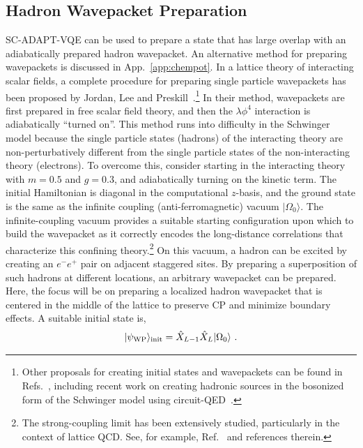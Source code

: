 \documentclass[aps, prc, tightenlines,superscriptaddress, letterpaper, amsmath, amssymb, preprintnumbers, floatfix, longbibliography, nofootinbib]{revtex4-2}
\begin{document}
\subsection{Hadron Wavepacket Preparation}
\label{sec:SCADAPTWP}
\noindent
SC-ADAPT-VQE can be used to prepare a state that has large overlap with an adiabatically prepared hadron wavepacket.
An alternative method for preparing wavepackets is discussed in App.~\ref{app:chempot}.
In a lattice theory of interacting scalar fields, a complete procedure for preparing single particle wavepackets has been proposed by Jordan, Lee and Preskill~\cite{Jordan_2018,DBLP:journals/qic/JordanLP14}.\footnote{Other proposals for creating initial states and wavepackets can be found in Refs.~\cite{Kuhn:2015zqa,Pichler:2015yqa,Damme:2019rts,Avkhadiev:2019niu,Surace:2020ycc,Karpov:2020pqe,Milsted:2020jmf,Vovrosh:2022bpj,Asaduzzaman:2022bpi,Avkhadiev:2022ttx,Farrell:2022vyh,Atas:2022dqm,Vary:2023ihk,Chai:2023qpq,Roy:2023uil}, including recent work on creating hadronic sources in the bosonized form of the Schwinger model using circuit-QED~\cite{Belyansky:2023rgh}.}
In their method, wavepackets are first prepared in free scalar field theory, and then the $\lambda \phi^4$ interaction is adiabatically ``turned on''.
This method runs into difficulty in the Schwinger model because the single particle states (hadrons) of the interacting theory are non-perturbatively different from the single particle states of the non-interacting theory (electrons).
To overcome this, consider starting in the interacting theory with $m=0.5$ and $g=0.3$, and adiabatically turning on the kinetic term.
The initial Hamiltonian is diagonal in the computational $z$-basis, and the ground state is the same as the infinite coupling (anti-ferromagnetic) vacuum $\vert \Omega_0 \rangle$.
The infinite-coupling vacuum provides a suitable starting configuration upon which to build the wavepacket as it correctly encodes the long-distance correlations that characterize this confining theory.\footnote{The strong-coupling limit has been extensively studied, particularly in the context of lattice QCD. See, for example, Ref.~\cite{Fromm:2009xw} and references therein.}
On this vacuum, a hadron can be excited by creating an $e^-e^+$ pair on adjacent staggered sites.
By preparing a superposition of such hadrons at different locations, an arbitrary wavepacket can be prepared. 
Here, the focus will be on preparing a localized hadron wavepacket that is centered in the middle of the lattice to preserve CP and minimize boundary effects.
A suitable initial state is, 
%
\begin{equation}
|\psi_{{\rm WP}}\rangle_{\text{init}} = \hat{X}_{L-1}\hat{X}_L\vert \Omega_0\rangle \ .
\end{equation}
\end{document}
